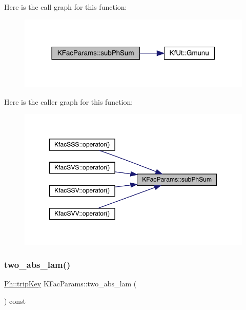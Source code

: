 Here is the call graph for this function\+:
\nopagebreak
\begin{figure}[H]
\begin{center}
\leavevmode
\includegraphics[width=318pt]{d7/d41/classKFacParams_a0f22066b9390b3a28b78d9c679c71f90_cgraph}
\end{center}
\end{figure}
Here is the caller graph for this function\+:
\nopagebreak
\begin{figure}[H]
\begin{center}
\leavevmode
\includegraphics[width=350pt]{d7/d41/classKFacParams_a0f22066b9390b3a28b78d9c679c71f90_icgraph}
\end{center}
\end{figure}
\mbox{\label{classKFacParams_a023894ddf4ee41134ce512a2bd2a8075}} 
\subsubsection{\texorpdfstring{two\_abs\_lam()}{two\_abs\_lam()}}
{\footnotesize\ttfamily \mbox{\hyperlink{namespacePh_afdd5bf3d7b37625115089ea3048e0cbb}{Ph\+::trip\+Key}} K\+Fac\+Params\+::two\+\_\+abs\+\_\+lam (\begin{DoxyParamCaption}{ }\end{DoxyParamCaption}) const\hspace{0.3cm}{\ttfamily [virtual]}}



